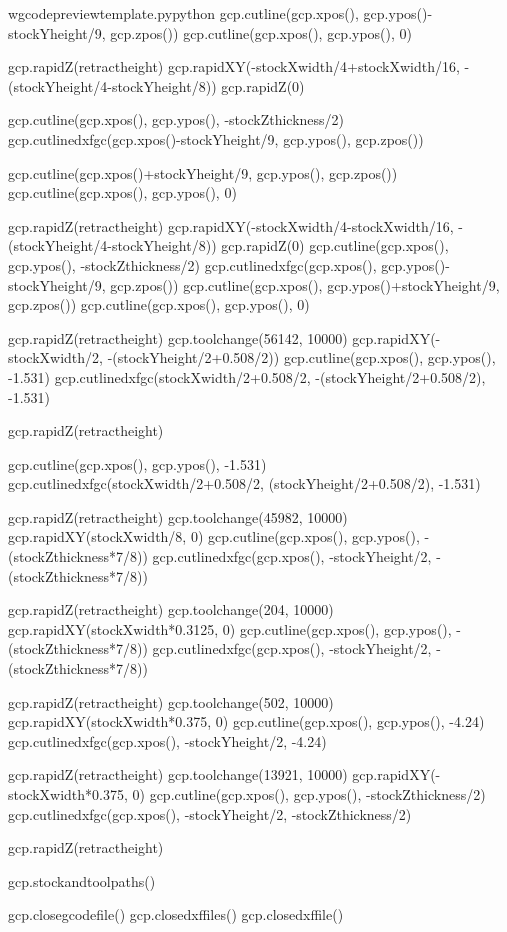 \documentclass{ltxdoc}
\begin{document}
\begin{writecode}{w}{gcodepreviewtemplate.py}{python}
gcp.cutline(gcp.xpos(), gcp.ypos()-stockYheight/9, gcp.zpos())
gcp.cutline(gcp.xpos(), gcp.ypos(), 0)

gcp.rapidZ(retractheight)
gcp.rapidXY(-stockXwidth/4+stockXwidth/16, -(stockYheight/4-stockYheight/8))
gcp.rapidZ(0)

gcp.cutline(gcp.xpos(), gcp.ypos(), -stockZthickness/2)
gcp.cutlinedxfgc(gcp.xpos()-stockYheight/9, gcp.ypos(), gcp.zpos())

gcp.cutline(gcp.xpos()+stockYheight/9, gcp.ypos(), gcp.zpos())
gcp.cutline(gcp.xpos(), gcp.ypos(), 0)

gcp.rapidZ(retractheight)
gcp.rapidXY(-stockXwidth/4-stockXwidth/16, -(stockYheight/4-stockYheight/8))
gcp.rapidZ(0)
gcp.cutline(gcp.xpos(), gcp.ypos(), -stockZthickness/2)
gcp.cutlinedxfgc(gcp.xpos(), gcp.ypos()-stockYheight/9, gcp.zpos())
gcp.cutline(gcp.xpos(), gcp.ypos()+stockYheight/9, gcp.zpos())
gcp.cutline(gcp.xpos(), gcp.ypos(), 0)

gcp.rapidZ(retractheight)
gcp.toolchange(56142, 10000)
gcp.rapidXY(-stockXwidth/2, -(stockYheight/2+0.508/2))
gcp.cutline(gcp.xpos(), gcp.ypos(), -1.531)
gcp.cutlinedxfgc(stockXwidth/2+0.508/2, -(stockYheight/2+0.508/2), -1.531)

gcp.rapidZ(retractheight)

gcp.cutline(gcp.xpos(), gcp.ypos(), -1.531)
gcp.cutlinedxfgc(stockXwidth/2+0.508/2, (stockYheight/2+0.508/2), -1.531)

gcp.rapidZ(retractheight)
gcp.toolchange(45982, 10000)
gcp.rapidXY(stockXwidth/8, 0)
gcp.cutline(gcp.xpos(), gcp.ypos(), -(stockZthickness*7/8))
gcp.cutlinedxfgc(gcp.xpos(), -stockYheight/2, -(stockZthickness*7/8))

gcp.rapidZ(retractheight)
gcp.toolchange(204, 10000)
gcp.rapidXY(stockXwidth*0.3125, 0)
gcp.cutline(gcp.xpos(), gcp.ypos(), -(stockZthickness*7/8))
gcp.cutlinedxfgc(gcp.xpos(), -stockYheight/2, -(stockZthickness*7/8))

gcp.rapidZ(retractheight)
gcp.toolchange(502, 10000)
gcp.rapidXY(stockXwidth*0.375, 0)
gcp.cutline(gcp.xpos(), gcp.ypos(), -4.24)
gcp.cutlinedxfgc(gcp.xpos(), -stockYheight/2, -4.24)

gcp.rapidZ(retractheight)
gcp.toolchange(13921, 10000)
gcp.rapidXY(-stockXwidth*0.375, 0)
gcp.cutline(gcp.xpos(), gcp.ypos(), -stockZthickness/2)
gcp.cutlinedxfgc(gcp.xpos(), -stockYheight/2, -stockZthickness/2)

gcp.rapidZ(retractheight)

gcp.stockandtoolpaths()

gcp.closegcodefile()
gcp.closedxffiles()
gcp.closedxffile()

\end{writecode}
\addtocounter{gcptmplpy}{328}
\end{document}
